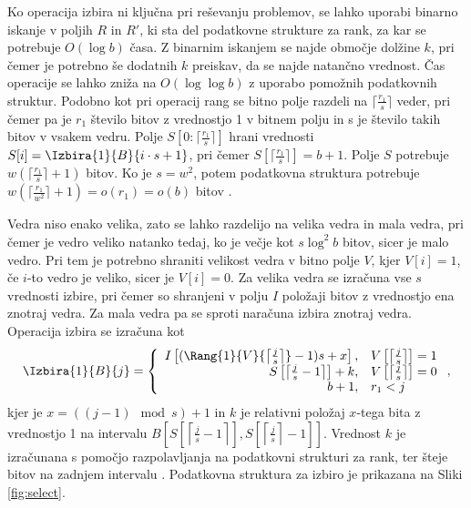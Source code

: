 Ko operacija izbira ni ključna pri reševanju problemov, se lahko uporabi binarno iskanje v poljih $R$ in $R'$, ki sta del podatkovne strukture za rank, za kar se potrebuje $O(\log{b})$ časa. Z binarnim iskanjem se najde območje dolžine $k$, pri čemer je potrebno še dodatnih $k$ preiskav, da se najde natančno vrednost.
Čas operacije se lahko zniža na $O(\log\log b)$ z uporabo pomožnih podatkovnih struktur. Podobno kot pri operacij rang se bitno polje razdeli na $\lceil \frac{r_1}{s} \rceil$ veder, pri čemer pa je $r_1$ število bitov z vrednostjo 1 v bitnem polju in s je število takih bitov v vsakem vedru. Polje $S[0:\lceil \frac{r_1}{s} \rceil]$ hrani vrednosti $S[i]=\Izbira{1}{B}{i\cdot s+1}$, pri čemer $S[\lceil \frac{r_1}{s} \rceil]=b+1$. Polje $S$ potrebuje $w(\lceil \frac{r_1}{s} \rceil +1)$ bitov. Ko je $s=w^2$, potem podatkovna struktura potrebuje $w(\lceil\frac{r_1}{w^2}\rceil+1)=o(r_1)=o(b)$ bitov \cite{Navarro2016}.

Vedra niso enako velika, zato se lahko razdelijo na velika vedra in mala vedra, pri čemer je vedro veliko natanko tedaj, ko je večje kot $s\log^2 b$ bitov, sicer je malo vedro. Pri tem je potrebno shraniti velikost vedra v bitno polje $V$, kjer $V[i]=1$, če $i$-to vedro je veliko, sicer je $V[i]=0$. Za velika vedra se izračuna vse $s$ vrednosti izbire, pri čemer so shranjeni v polju $I$ položaji bitov z vrednostjo ena znotraj vedra. Za mala vedra pa se sproti naračuna izbira znotraj vedra. Operacija izbira se izračuna kot
\begin{equation*}
    \Izbira{1}{B}{j}=\left\{
    \begin{array}{rl}
       I\left[(\Rang{1}{V}{\left\lceil \frac{j}{s} \right\rceil}-1)s+x\right], & V\left[\left\lceil \frac{j}{s} \right\rceil\right] = 1\\ 
       S\left[\left\lceil \frac{j}{s} -1 \right\rceil\right] + k, & V\left[\left\lceil \frac{j}{s} \right\rceil\right] = 0\\
       b+1, & r_1 < j
    \end{array}\right.,
\end{equation*}
kjer je $x = ((j-1) \mod{s})+1$ in $k$ je relativni položaj $x$-tega bita z vrednostjo 1 na intervalu $B\left[ S\left[\left\lceil \frac{j}{s} -1 \right\rceil\right], S\left[\left\lceil \frac{j}{s} \right\rceil-1\right]\right]$. Vrednost $k$ je izračunana s pomočjo razpolavljanja na podatkovni strukturi za rank, ter šteje bitov na zadnjem intervalu \cite{Navarro2016}. Podatkovna struktura za izbiro je prikazana na Sliki \ref{fig:select}.

